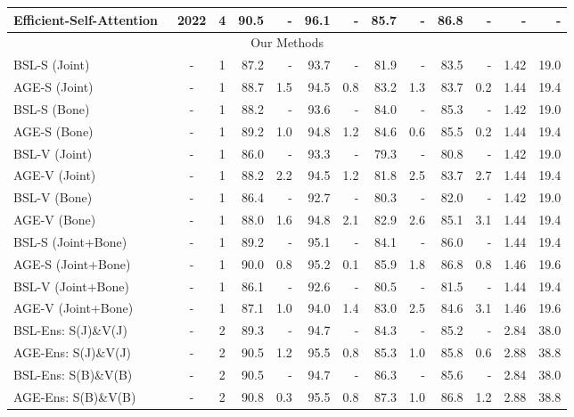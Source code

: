\documentclass[journal,comsoc]{IEEEtran}
\def\ange{AGE}
\begin{document}
\begin{table*}[t]
{\begin{tabular}{l c c | rrrr | rrrr | r r}
\\
\rowcolor{Gray!30}
Efficient-Self-Attention~\cite{qin2022efficient} & 2022 & 4 & 90.5 & - & 96.1 & - & 85.7 & - & 86.8 & - & - & -
\\
\midrule 
\multicolumn{13}{c}{Our Methods} \\
\midrule 
\rowcolor{Gray!30}
BSL-S (Joint) & - & 1 & 87.2 & - & 93.7 & - & 81.9 & - & 83.5 & - & 1.42 & 19.0 \\
\ange{}-S (Joint) & - & 1 & 88.7 & 1.5 & 94.5 & 0.8 & 83.2 & 1.3 & 83.7 & 0.2 & 1.44 & 19.4 \\
\midrule 
\rowcolor{Gray!30}
BSL-S (Bone) & - & 1 & 88.2 & - & 93.6 & - & 84.0 & - & 85.3 & - & 1.42 & 19.0 \\
\ange{}-S (Bone) & - & 1 & 89.2 & 1.0 & 94.8 & 1.2 & 84.6 & 0.6 & 85.5 & 0.2 & 1.44 & 19.4 \\
\midrule 
\rowcolor{Gray!30}
BSL-V (Joint) & - & 1 & 86.0 & - & 93.3 & - & 79.3 & - & 80.8 & - & 1.42 & 19.0 \\
\ange{}-V (Joint) & - & 1 & 88.2 & 2.2 & 94.5 & 1.2 & 81.8 & 2.5 & 83.7 & 2.7 & 1.44 & 19.4 \\
\midrule
\rowcolor{Gray!30}
BSL-V (Bone) & - & 1 & 86.4 & - & 92.7 & - & 80.3 & - & 82.0 & - & 1.42 & 19.0 \\
\ange{}-V (Bone) & - & 1 & 88.0 & 1.6 & 94.8 & 2.1 & 82.9 & 2.6 & 85.1 & 3.1 & 1.44 & 19.4 \\
\midrule
\rowcolor{Gray!30}
BSL-S (Joint+Bone) & - & 1 & 89.2 & - & 95.1 & - & 84.1 & - & 86.0  & - & 1.44 & 19.4 \\
\ange{}-S (Joint+Bone) & - & 1 & 90.0 & 0.8 & 95.2 & 0.1 & 85.9 & 1.8 & 86.8 & 0.8 & 1.46 & 19.6 \\
\midrule
\rowcolor{Gray!30}
BSL-V (Joint+Bone) & - & 1 & 86.1 & - & 92.6 & - & 80.5 & - & 81.5 & - & 1.44 & 19.4 \\
\ange{}-V (Joint+Bone) & - & 1 & 87.1 & 1.0 & 94.0 & 1.4 & 83.0 & 2.5 & 84.6 & 3.1 & 1.46 & 19.6 \\
\midrule 
\rowcolor{Gray!30}
BSL-Ens: S(J)\&V(J) & - & 2 & 89.3 & - & 94.7 & - & 84.3 & - & 85.2 & - & 2.84 & 38.0 \\ 
\ange{}-Ens: S(J)\&V(J) & - & 2 & 90.5 & 1.2 & 95.5 & 0.8 & 85.3 & 1.0 & 85.8 & 0.6 & 2.88 & 38.8 \\ 
\midrule 
\rowcolor{Gray!30}
BSL-Ens: S(B)\&V(B) & - & 2 & 90.5 & - & 94.7 & - & 86.3 & - &  85.6 & - & 2.84 & 38.0 \\ 
\ange{}-Ens: S(B)\&V(B) & - & 2 & 90.8 & 0.3 & 95.5 & 0.8 & 87.3 & 1.0 & 86.8 & 1.2 & 2.88 & 38.8 \\ 

\end{tabular}}
\end{table*}
\end{document}
